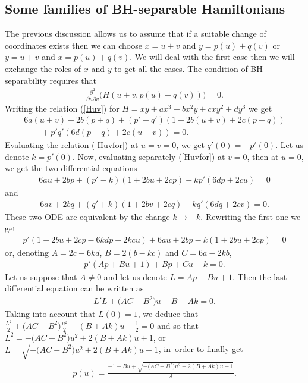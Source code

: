 \documentclass[pdftex]{sigma}%
\numberwithin{equation}{section}
\begin{document}
\subsection{Some families of BH-separable Hamiltonians}

The previous discussion allows us to assume that if a suitable change of coordinates exists then we can choose $x=u+v$ and $y=p(u)+q(v)$ or $y=u+v$ and $x=p(u)+q(v)$. We will deal with the first case then we will exchange the roles of $x$ and $y$ to get all the cases. The condition of BH-separability requires that
\begin{gather}\label{Huv}
\frac{\partial^2}{\partial u\partial v}\big(H(u+v,p(u)+q(v))\big)=0.
\end{gather}
Writing the relation (\ref{Huv}) for $H=xy+ax^3+bx^2y+cxy^2+dy^3$ we get
\begin{gather}
6a(u+v)+2b(p+q)+(p'+q')(1+2b(u+v)+2c(p+q))\nonumber
\\ \qquad
{}+p'q'(6d(p+q)+2c(u+v))=0.\label{Huvfor}
\end{gather}
Evaluating the relation (\ref{Huvfor})
at $u=v=0$, we get $q'(0)=-p'(0)$. Let us denote $k=p'(0)$.
Now, evaluating separately (\ref{Huvfor}) at $v=0$, then at $u=0$, we get the two differential equations
\begin{gather*}
6au+2bp+(p'-k)(1+2bu+2cp)-kp'(6dp+2cu)=0
\end{gather*}
and
\begin{gather*}
6av+2bq+(q'+k)(1+2bv+2cq)+kq'(6dq+2cv)=0.
\end{gather*}
These two ODE are equivalent by the change $k\mapsto-k$.
Rewriting the first one we get
\begin{gather*}
p'(1+2bu+2cp-6kdp-2kcu)+6au+2bp-k(1+2bu+2cp)=0
\end{gather*}
or, denoting $A=2c-6kd$, $B=2(b-kc)$ and $C=6a-2kb$,
\begin{gather*}
p'(Ap+Bu+1)+Bp+Cu-k=0.
\end{gather*}
Let us suppose that $A\not=0$ and let us denote $L=Ap+Bu+1$. Then the last differential equation can be written as
\begin{gather*}
L'L+\big(AC-B^2\big)u-B-Ak=0.
\end{gather*}
Taking into account that $L(0)=1$, we deduce that
$\frac{L^2}{2}+\big(AC-B^2\big)\frac{u^2}2-(B+Ak)u-\frac12=0$ and so
that
$L^2=-\big(AC-B^2\big)u^2+2(B+Ak)u+1$, or
$L=\sqrt{-\big(AC-B^2\big)u^2+2(B+Ak)u+1}$, in~order to finally get
\begin{gather}\label{pu}
p(u)=\frac{-1-Bu+\sqrt{-\big(AC-B^2\big)u^2+2(B+Ak)u+1}}{A}.
\end{gather}
\end{document}
